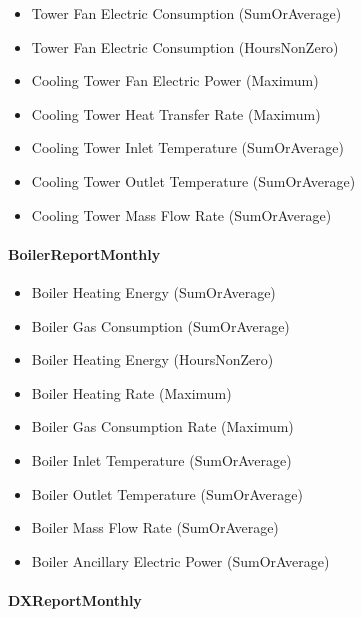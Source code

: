 \begin{itemize}
\item
  Tower Fan Electric Consumption (SumOrAverage)
\item
  Tower Fan Electric Consumption (HoursNonZero)
\item
  Cooling Tower Fan Electric Power (Maximum)
\item
  Cooling Tower Heat Transfer Rate (Maximum)
\item
  Cooling Tower Inlet Temperature (SumOrAverage)
\item
  Cooling Tower Outlet Temperature (SumOrAverage)
\item
  Cooling Tower Mass Flow Rate (SumOrAverage)
\end{itemize}

\paragraph{BoilerReportMonthly}\label{boilerreportmonthly}

\begin{itemize}
\item
  Boiler Heating Energy (SumOrAverage)
\item
  Boiler Gas Consumption (SumOrAverage)
\item
  Boiler Heating Energy (HoursNonZero)
\item
  Boiler Heating Rate (Maximum)
\item
  Boiler Gas Consumption Rate (Maximum)
\item
  Boiler Inlet Temperature (SumOrAverage)
\item
  Boiler Outlet Temperature (SumOrAverage)
\item
  Boiler Mass Flow Rate (SumOrAverage)
\item
  Boiler Ancillary Electric Power (SumOrAverage)
\end{itemize}

\paragraph{DXReportMonthly}\label{dxreportmonthly}

